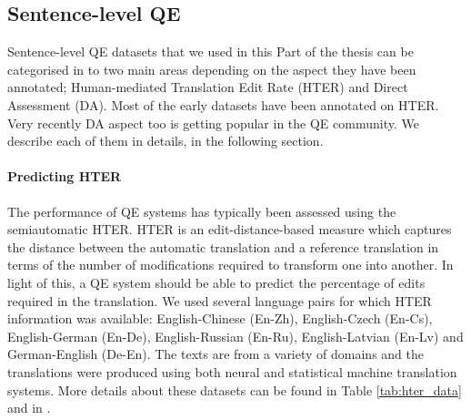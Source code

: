 \subsection{Sentence-level QE}
Sentence-level QE datasets that we used in this Part of the thesis can be categorised in to two main areas depending on the aspect they have been annotated; Human-mediated Translation Edit Rate (HTER) and Direct Assessment (DA). Most of the early datasets have been annotated on HTER. Very recently DA aspect too is getting popular in the QE community. We describe each of them in details, in the following section.


\paragraph{Predicting HTER}
The performance of QE systems has typically been assessed using the semiautomatic HTER. HTER is an edit-distance-based measure which captures the distance between the automatic translation and a reference translation in terms of the number of modifications required to transform one into another. In light of this, a QE system should be able to predict the percentage of edits required in the translation. We used several language pairs for which HTER information was available: English-Chinese (En-Zh), English-Czech (En-Cs), English-German (En-De), English-Russian (En-Ru), English-Latvian (En-Lv) and German-English (De-En). The texts are from a variety of domains and the translations were produced using both neural and statistical machine translation systems. More details about these datasets can be found in Table \ref{tab:hter_data} and in \autocite{specia-etal-2018-findings,fonseca-etal-2019-findings,specia-etal-2020-findings-wmt}.


